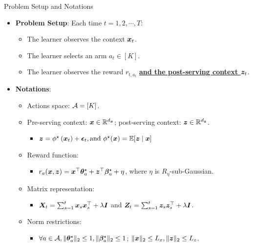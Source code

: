 \documentclass[10pt, xcolor={dvipsnames,x11names},compress]{beamer}
\begin{document}
\begin{frame}[label=Background]{Problem Setup and Notations}

\begin{itemize}
    \item \textbf{Problem Setup}: Each time $t = 1, 2, \cdots, T$:
    \begin{itemize}
        \item The learner observes the context ${\bm{x}}_t$.
        \item The learner selects an arm $a_t \in [K] $.
        \item The learner observes the reward $r_{t,a_t}$ \underline{\textcolor{sad}{\textbf{and the post-serving context ${\bm{z}}_t$}}}.
    \end{itemize}
\end{itemize}


\begin{itemize} \color{gray}
    \item \textbf{Notations}:
    \begin{itemize} \color{gray}
        \item Actions space: ${\mathcal{A}} = [K]$.
        
        \item Pre-serving context: ${\bm{x}} \in {\mathbb{R}}^{d_{{\bm{x}}}}$; post-serving context: ${\bm{z}} \in {\mathbb{R}}^{d_{{\bm{z}}}}$.
        \begin{itemize} \color{gray}
            \item ${\bm{z}} = \phi^{\star}\left({\bm{x}}_t\right)+{\bm{\epsilon}}_t, \text{and } \phi^{\star}({\bm{x}})={\mathbb{E}}[{\bm{z}} \mid {\bm{x}}]$
        \end{itemize}
        
        \item Reward function: 
        \begin{itemize} \color{gray}
            \item $r_{a}({\bm{x}}, {\bm{z}}) = {\bm{x}}^\top {\bm{\theta}}_a^\star + {\bm{z}}^\top {\bm{\beta}}_a^\star + \eta$, where $\eta$ is $R_{\eta}$-sub-Gaussian.
        \end{itemize}
        
        \item Matrix representation: 
        \begin{itemize} \color{gray}
            \item ${\bm{X}}_{t} = \sum_{s=1}^t {\bm{x}}_s{\bm{x}}_s^\top + \lambda {\bm{I}}$ and ${\bm{Z}}_t = \sum_{s=1}^t {\bm{z}}_s {\bm{z}}_s^\top + \lambda {\bm{I}}$.
        \end{itemize}
        
        \item Norm restrictions: 
        \begin{itemize} \color{gray}
            \item $\forall a \in {\mathcal{A}}, \|{\bm{\theta}}_a^\star\|_2\leq 1, \|{\bm{\beta}}_{a}^\star\|_2\leq 1 $; $\|{\bm{x}}\|_2\leq L_x, \|{\bm{z}}\|_2 \leq L_z$.
        \end{itemize}
        
    \end{itemize}
\end{itemize}

\end{frame}
\end{document}

